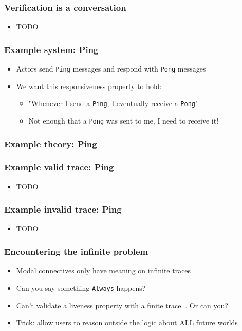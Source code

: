 \documentclass[12pt,aspectratio=169]{beamer}
\begin{document}
\begin{frame}
\frametitle{Verification is a conversation}
\begin{itemize}
  \item TODO
\end{itemize}
\end{frame}

\begin{frame}
\frametitle{Example system: Ping}
\begin{itemize}
  \item Actors send \texttt{Ping} messages and respond with \texttt{Pong} messages
  \item We want this responsiveness property to hold:
  \begin{itemize}
    \item "Whenever I send a \texttt{Ping}, I eventually receive a \texttt{Pong}"
    \item Not enough that a \texttt{Pong} was sent to me, I need to receive it!
  \end{itemize}
\end{itemize}
\end{frame}

\begin{frame}
\frametitle{Example theory: Ping}
  {\fontsize{10}{12}\selectfont
    
  }
\end{frame}

\begin{frame}
\frametitle{Example valid trace: Ping}
\begin{itemize}
  \item TODO
\end{itemize}
\end{frame}

\begin{frame}
\frametitle{Example invalid trace: Ping}
\begin{itemize}
  \item TODO
\end{itemize}
\end{frame}

\begin{frame}
\frametitle{Encountering the infinite problem}
\begin{itemize}
  \item Modal connectives only have meaning on infinite traces
  \item Can you say something \texttt{Always} happens?
  \item Can't validate a liveness property with a finite trace... Or can you?
  \item Trick: allow users to reason outside the logic about ALL future worlds
\end{itemize}
\end{frame}
\end{document}

